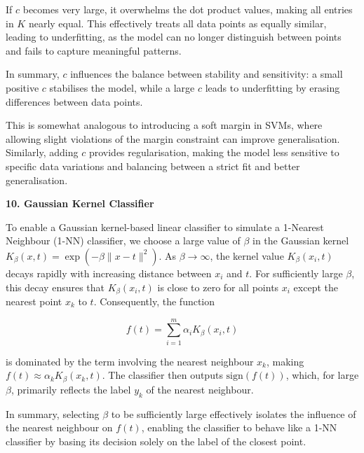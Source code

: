 \documentclass{article}
\begin{document}
\begin{itemize}
    If \( c \) becomes very large, it overwhelms the dot product values, making all entries in \( K \) nearly equal. This effectively treats all data points as equally similar, leading to underfitting, as the model can no longer distinguish between points and fails to capture meaningful patterns.

    In summary, \( c \) influences the balance between stability and sensitivity: a small positive \( c \) stabilises the model, while a large \( c \) leads to underfitting by erasing differences between data points.

    This is somewhat analogous to introducing a soft margin in SVMs, where allowing slight violations of the margin constraint can improve generalisation. Similarly, adding \( c \) provides regularisation, making the model less sensitive to specific data variations and balancing between a strict fit and better generalisation.

\end{itemize}
\vspace{0.5cm}

\vspace{0.5cm}
\noindent\textbf{10. Gaussian Kernel Classifier}
\vspace{0.5cm}


\begin{itemize}
    To enable a Gaussian kernel-based linear classifier to simulate a 1-Nearest Neighbour (1-NN) classifier, we choose a large value of \(\beta\) in the Gaussian kernel \( K_\beta(x, t) = \exp(-\beta \| x - t \|^2) \). As \(\beta \to \infty\), the kernel value \( K_\beta(x_i, t) \) decays rapidly with increasing distance between \( x_i \) and \( t \). For sufficiently large \(\beta\), this decay ensures that \( K_\beta(x_i, t) \) is close to zero for all points \( x_i \) except the nearest point \( x_k \) to \( t \). Consequently, the function
    
    \[
    f(t) = \sum_{i=1}^m \alpha_i K_\beta(x_i, t)
    \]
    
    is dominated by the term involving the nearest neighbour \( x_k \), making \( f(t) \approx \alpha_k K_\beta(x_k, t) \). The classifier then outputs \( \text{sign}(f(t)) \), which, for large \(\beta\), primarily reflects the label \( y_k \) of the nearest neighbour.
    
    In summary, selecting \(\beta\) to be sufficiently large effectively isolates the influence of the nearest neighbour on \( f(t) \), enabling the classifier to behave like a 1-NN classifier by basing its decision solely on the label of the closest point.
\end{itemize}
\end{document}
